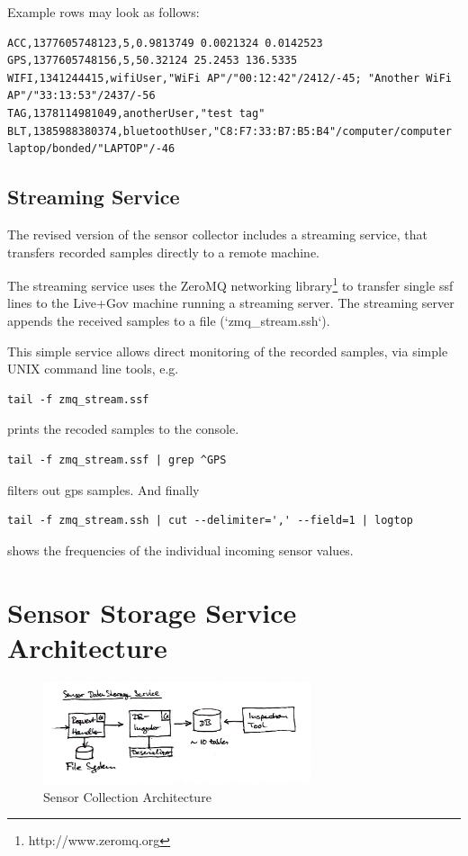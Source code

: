 Example rows may look as follows:
\small
\begin{verbatim}
ACC,1377605748123,5,0.9813749 0.0021324 0.0142523
GPS,1377605748156,5,50.32124 25.2453 136.5335
WIFI,1341244415,wifiUser,"WiFi AP"/"00:12:42"/2412/-45; "Another WiFi AP"/"33:13:53"/2437/-56
TAG,1378114981049,anotherUser,"test tag"
BLT,1385988380374,bluetoothUser,"C8:F7:33:B7:B5:B4"/computer/computer laptop/bonded/"LAPTOP"/-46
\end{verbatim}
\normalsize

\subsection{Streaming Service}

The revised version of the sensor collector includes a streaming
service, that transfers recorded samples directly to a remote machine.

The streaming service uses the ZeroMQ networking
library\footnote{http://www.zeromq.org} to transfer single ssf lines
to the Live+Gov machine running a streaming server. The streaming
server appends the received samples to a file (`zmq_stream.ssh`).

This simple service allows direct monitoring of the recorded samples,
via simple UNIX command line tools, e.g. 
\begin{verbatim} 
tail -f zmq_stream.ssf 
\end{verbatim}
prints the recoded samples to the console.
\begin{verbatim} 
tail -f zmq_stream.ssf | grep ^GPS 
\end{verbatim} 
filters out gps samples. And finally
\begin{verbatim} 
tail -f zmq_stream.ssh | cut --delimiter=',' --field=1 | logtop  
\end{verbatim}

shows the frequencies of the individual incoming sensor values.

\section{Sensor Storage Service Architecture}

\begin{figure}[htbp]
\centering
\includegraphics[width=0.7\textwidth]{img/sc/ss_architecture.jpg}
\caption{Sensor Collection Architecture}\label{fig:ss_architecture}
\end{figure}

